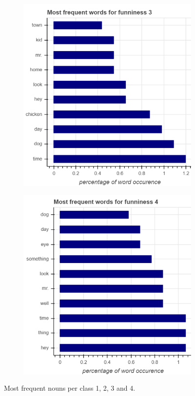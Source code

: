\documentclass[draft,final,oneside]{vutinfth} %
\begin{document}
\begin{figure}
\begin{subfigure}[b]{0.45\textwidth}
\centering
\includegraphics[width=1.0\textwidth]{graphics/word_occurence/funniness_3}
\end{subfigure}\quad
\begin{subfigure}[b]{0.45\textwidth}
\centering
\includegraphics[width=1.0\textwidth]{graphics/word_occurence/funniness_4}
\end{subfigure}


\caption{Most frequent nouns per class 1, 2, 3 and 4.}
\label{fig:wordocc1}

\end{figure}
\end{document}
